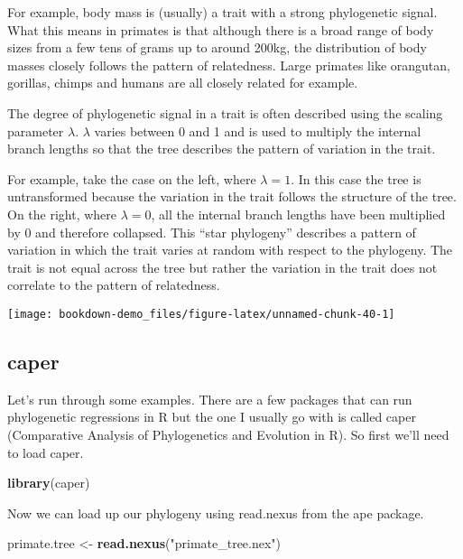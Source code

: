 \documentclass[]{book}
\newenvironment{Shaded}{\begin{snugshade}}{\end{snugshade}}
\newcommand{\KeywordTok}[1]{\textcolor[rgb]{0.13,0.29,0.53}{\textbf{#1}}}
\newcommand{\StringTok}[1]{\textcolor[rgb]{0.31,0.60,0.02}{#1}}
\newcommand{\NormalTok}[1]{#1}
\begin{document}
For example, body mass is (usually) a trait with a strong phylogenetic
signal. What this means in primates is that although there is a broad
range of body sizes from a few tens of grams up to around 200kg, the
distribution of body masses closely follows the pattern of relatedness.
Large primates like orangutan, gorillas, chimps and humans are all
closely related for example.

The degree of phylogenetic signal in a trait is often described using
the scaling parameter \(\lambda\). \(\lambda\) varies between 0 and 1
and is used to multiply the internal branch lengths so that the tree
describes the pattern of variation in the trait.

For example, take the case on the left, where \(\lambda = 1\). In this
case the tree is untransformed because the variation in the trait
follows the structure of the tree. On the right, where \(\lambda = 0\),
all the internal branch lengths have been multiplied by 0 and therefore
collapsed. This ``star phylogeny'' describes a pattern of variation in
which the trait varies at random with respect to the phylogeny. The
trait is not equal across the tree but rather the variation in the trait
does not correlate to the pattern of relatedness.

\begin{center}\texttt{[image: bookdown-demo\_files/figure-latex/unnamed-chunk-40-1]} \end{center}

\subsection{caper}\label{caper}

Let's run through some examples. There are a few packages that can run
phylogenetic regressions in R but the one I usually go with is called
caper (Comparative Analysis of Phylogenetics and Evolution in R). So
first we'll need to load caper.

\begin{Shaded}
\begin{Highlighting}[]
\KeywordTok{library}\NormalTok{(caper)}
\end{Highlighting}
\end{Shaded}

Now we can load up our phylogeny using read.nexus from the ape package.

\begin{Shaded}
\begin{Highlighting}[]
\NormalTok{primate.tree <-}\StringTok{ }\KeywordTok{read.nexus}\NormalTok{(}\StringTok{"primate_tree.nex"}\NormalTok{)}
\end{Highlighting}
\end{Shaded}
\end{document}
